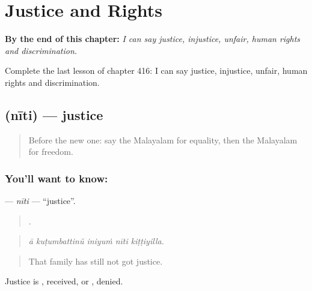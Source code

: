 
\chapter{Justice and Rights}
\label{ch:ml-justice-and-rights}

\begin{chapteropening}
\textbf{By the end of this chapter:} \emph{I can say justice, injustice, unfair, human rights and discrimination.}

Complete the last lesson of chapter 416: I can say justice, injustice, unfair, human rights and discrimination.
\end{chapteropening}

\section[\texorpdfstring{\ml{നീതി} (nīti)}{നീതി (nīti)}]{ (nīti) — justice}

\label{lesson:ML-C416-niti}



\begin{quote}
Before the new one: say the Malayalam for equality, then the Malayalam for freedom.
\end{quote}

\subsection*{You'll want to know: }
\textbf{} — \emph{nīti} — \textquotedblleft{}justice\textquotedblright{}.

\begin{quote}
    .
\end{quote}

\begin{quote}
\emph{ā kuṭumbattinŭ iniyuṁ nīti kiṭṭiyilla.}
\end{quote}

\begin{quote}
That family has still not got justice.
\end{quote}

Justice is , received, or , denied.

